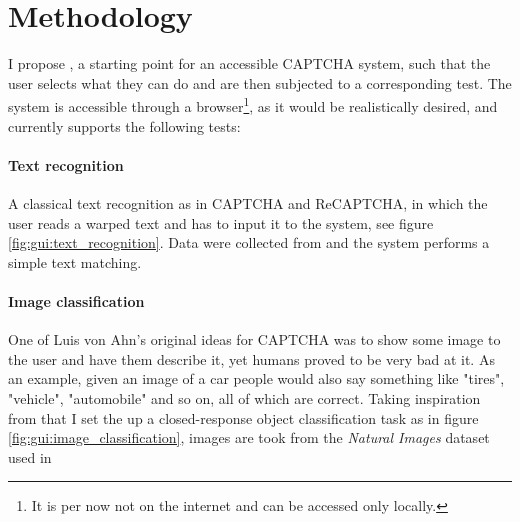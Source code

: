 \section{Methodology}
I propose \name, a starting point for an accessible CAPTCHA system, such that the user selects what they can do and are then subjected to a corresponding test.
The system is accessible through a browser\footnote{It is per now not on the internet and can be accessed only locally.}, as it would be realistically desired, and currently supports the following tests:

\paragraph{Text recognition}
A classical text recognition as in CAPTCHA and ReCAPTCHA, in which the user reads a warped text and has to input it to the system, see figure \ref{fig:gui:text_recognition}.
Data were collected from \cite{wilhemy2013dataset,gregwar2022captcha} and the system performs a simple text matching.

\paragraph{Image classification}
One of Luis von Ahn's original ideas for CAPTCHA was to show some image to the user and have them describe it, yet humans proved to be very bad at it.
As an example, given an image of a car people would also say something like "tires", "vehicle", "automobile" and so on, all of which are correct.
Taking inspiration from that I set the up a closed-response object classification task as in figure \ref{fig:gui:image_classification}, images are took from the \emph{Natural Images} dataset used in \cite{roy2018deep}

